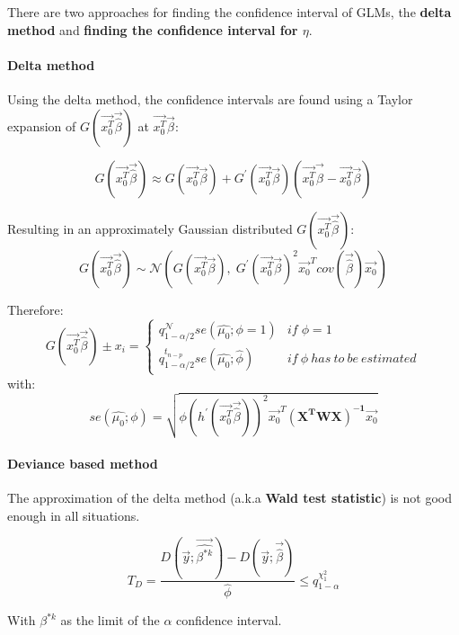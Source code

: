 There are two approaches for finding the confidence interval of GLMs, the \textbf{delta method} and \textbf{finding the confidence interval for $\eta$}.

\paragraph{Delta method}
Using the delta method, the confidence intervals are found using a Taylor expansion of $G(\vec{x_0^T}\vec{\hat{\beta}})$ at $\vec{x_0^T}\vec{\beta}$:

\begin{equation*}
G(\vec{x_0^T}\vec{\hat{\beta}}) \approx G(\vec{x_0^T}\vec{\beta}) + G^{'}(\vec{x_0^T}\vec{\beta}) (\vec{x_0^T}\vec{\hat{\beta}} - \vec{x_0^T}\vec{\beta})
\end{equation*}

Resulting in an approximately Gaussian distributed $G(\vec{x_0^T}\vec{\hat{\beta}})$:
\begin{equation*}
G(\vec{x_0^T}\vec{\hat{\beta}}) \sim \mathcal{N}\left (G(\vec{x_0^T}\vec{\beta}),\; G^{'}(\vec{x_0^T}\vec{\beta})^2 \vec{x_0}^T cov(\vec{\hat{\beta}})\vec{x_0}\right)
\end{equation*}

Therefore:
\begin{equation*}
G(\vec{x_0^T}\vec{\hat{\beta}}) \pm x_i = \begin{cases}
q^\mathcal{N}_{1-\alpha/2}se(\hat{\mu_0};\phi=1) & if\; \phi = 1 \\
q^{t_{n-p}}_{1-\alpha/2}se(\hat{\mu_0};\hat {\phi}) & if\: \phi\: has\: to\: be\: estimated
\end{cases}
\end{equation*}
with:
\begin{equation*}
se(\hat{\mu_0};\phi) = \sqrt{\phi \left(h^{'}(\vec{x_0^T}\vec{\hat{\beta}})\right)^2 \vec{x_0}^T\bm{(X^TWX)^{-1}}\vec{x_0}}
\end{equation*}

\paragraph{Deviance based method}
The approximation of the delta method (a.k.a \textbf{Wald test statistic}) is not good enough in all situations.

\begin{equation*}
T_D = \frac{D(\vec{y};\vec{\hat{\beta^{*k}}})-D(\vec{y};\vec{\hat{\beta}})}{\hat{\phi}} \leq q^{\chi^2_1}_{1-\alpha}
\end{equation*}

With $\beta^{*k}$ as the limit of the $\alpha$ confidence interval.
